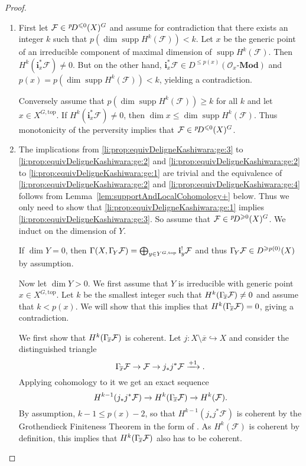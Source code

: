 \documentclass{compositio}
\theoremstyle{plain}
\theoremstyle{definition}
\theoremstyle{remark}
\newcommand\sheaf{\mathcal}
\newcommand\cat{\mathbf}
\newcommand\catModules[1]{#1\text{-}\cat{Mod}}
\newcommand\supp{\operatorname{supp}}
\newcommand\perv[1][p]{\mkern1mu{}^{#1}\mkern-3mu}
\newcommand\lc[1]{\Gamma_{\mkern-3mu#1}}
\newcommand\Xtop[1][X]{#1^{G,\mathrm{top}}}
\begin{document}
\begin{proof}\leavevmode
    \begin{enumerate}
        \item
            First let $\sheaf F \in  \perv D^{\leq 0}(X)^G$ and assume for contradiction that there exists an integer $k$ such that $p(\dim \supp H^{k}(\sheaf F)) < k$.
            Let $x$ be the generic point of an irreducible component of maximal dimension of $\supp H^{k}(\sheaf F)$.
            Then $H^k(\mathbf i_x^* \sheaf F) \ne 0$. 
            But on the other hand, $\mathbf i_x^*\sheaf F \in  D^{\leq p(x)}(\catModules{\sheaf{O}_x})$ and $p(x) = p(\dim \supp H^{k}(\sheaf F)) < k$, yielding a contradiction.

            Conversely assume that $p(\dim \supp H^{k}(\sheaf F)) \geq  k$ for all $k$ and let $x \in  \Xtop$.
            If $H^k(\mathbf i_x^*\sheaf F) \ne 0$, then $\dim x \leq  \dim \supp H^{k}(\sheaf F)$.
            Thus monotonicity of the perversity implies that $\sheaf F \in  \perv D^{\leq 0}(X)^G$.
        \item
            The implications from \ref{li:prop:equivDeligneKashiwara:ge:3} to \ref{li:prop:equivDeligneKashiwara:ge:2} and \ref{li:prop:equivDeligneKashiwara:ge:2} to \ref{li:prop:equivDeligneKashiwara:ge:1} are trivial and the equivalence of \ref{li:prop:equivDeligneKashiwara:ge:2} and \ref{li:prop:equivDeligneKashiwara:ge:4} follows from Lemma~\ref{lem:supportAndLocalCohomology+} below.
            Thus we only need to show that \ref{li:prop:equivDeligneKashiwara:ge:1} implies \ref{li:prop:equivDeligneKashiwara:ge:3}.
            So assume that $\sheaf F \in  \perv D^{\geq 0}(X)^G$.
            We induct on the dimension of $Y$.
            
            If $\dim Y = 0$, then $\Gamma (X,\lc Y \sheaf F) = \bigoplus_{y \in  \Xtop[Y]} \mathbf i_y^!\sheaf F$ and thus $\lc Y\sheaf F \in  D^{\geq p(0)}(X)$ by assumption.

            Now let $\dim Y > 0$.
            We first assume that $Y$ is irreducible with generic point $x \in  \Xtop$.
            Let $k$ be the smallest integer such that $H^k(\lc {\overline x} \sheaf F) \ne 0$ and assume that $k < p(x)$.
            We will show that this implies that $H^k(\lc {\overline x}\sheaf F) = 0$, giving a contradiction.

            We first show that $H^k(\lc {\overline x}\sheaf F)$ is coherent.
            Let $j\colon X \setminus {\overline x} \hookrightarrow X$ and consider the distinguished triangle
            \[
                \lc {\overline x} \sheaf F \to  \sheaf F \to  j_*j^* \sheaf F \xrightarrow{+1}.
            \]
            Applying cohomology to it we get an exact sequence
            \[
                H^{k-1}(j_*j^*\sheaf F) \to  H^k(\lc{\overline x} \sheaf F) \to  H^k(\sheaf F).
            \]
            By assumption, $k-1 \le p(x) - 2$, so that $H^{k-1}(j_*j^*\sheaf F)$ is coherent by the Grothendieck Finiteness Theorem in the form of \cite[Corollary~3]{Bezrukavnikov:arXiv:PerverseCoherentSheaves}.
            As $H^k(\sheaf F)$ is coherent by definition, this implies that $H^k(\lc{\overline x} \sheaf F)$ also has to be coherent.


\end{enumerate}
\end{proof}
\end{document}
